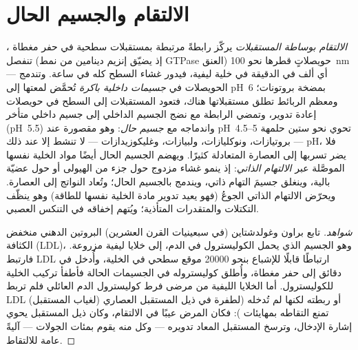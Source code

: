 \section{الالتقام والجسيم الحال}

\begin{definition}[الالتقام]\label{def:b3:membrane-traffic:endocytosis}
\emph{الالتقام بوساطة المستقبلات} يركّز رابطةً مرتبطة
بمستقبلات سطحية في حفر مغطاة ، تنفصل (إذ يضيّق
إنزيم دينامين من نمط GTPase العنق) حويصلاتٍ قطرها نحو \qty{100}{nm}
--- أي ألف في الدقيقة في خلية ليفية، فيدور غشاء السطح
كله في ساعة. وتندمج الحويصلات في \emph{جسيمات داخلية
باكرة} تُحمَّض لمعتها إلى pH~6 بمضخة بروتونات؛ ومعظم
الربائط تطلق مستقبلاتها هناك، فتعود المستقبلات إلى
السطح في حويصلات إعادة تدوير، وتمضي الرابطة مع نضج
الجسيم الداخلي إلى جسيم داخلي متأخر (pH~5.5) واندماجه مع
\emph{جسيم حال}: وهو مقصورة عند pH~4.5--5 تحوي نحو ستين
حلمهة --- بروتيازات، ونوكليازات، ولبيازات، وغليكوزيدازات --- لا تنشط
إلا عند ذلك pH، فلا يضر تسربها إلى العصارة المتعادلة
كثيرًا. ويهضم الجسيم الحال أيضًا مواد الخلية نفسها الموصَّلة عبر
\emph{الالتهام الذاتي}: إذ ينمو غشاء مزدوج حول جزء من الهيولى
أو حول عضيّة بالية، وينغلق جسيمَ التهام ذاتي، ويندمج
بالجسيم الحال؛ وتُعاد النواتج إلى العصارة. ويحرّض الالتهام الذاتي
الجوعُ (فهو يعيد تدوير مادة الخلية نفسها للطاقة)
وهو ينظّف التكتلات والمتقدرات المتأذية؛ ويُتهم إخفاقه
في التنكس العصبي.
\end{definition}

\begin{proof}[شواهد]
تابع براون وغولدشتاين (في سبعينيات القرن العشرين) البروتين الدهني منخفض الكثافة (LDL)،
وهو الجسيم الذي يحمل الكوليسترول في الدم، إلى خلايا ليفية
مزروعة. فارتبط LDL ارتباطًا قابلًا للإشباع بنحو \num{20000} موقع سطحي في
الخلية، وأُدخل في دقائق إلى حفر مغطاة، وأُطلق
كوليستروله في الجسيمات الحالة فأطفأ تركيب الخلية
للكوليسترول. أما الخلايا الليفية من مرضى فرط
كوليسترول الدم العائلي فلم تربط LDL (لغياب المستقبل) أو ربطته لكنها
لم تُدخله (لطفرة في ذيل المستقبل العصاري
تمنع التقاطه بمهايئات ): فكان المرض
عيبًا في الالتقام، وكان ذيل المستقبل يحوي إشارة الإدخال،
وترسخ المستقبل المعاد تدويره --- وكل منه يقوم بمئات الجولات
--- آليةً عامة للالتقاط.
\end{proof}

